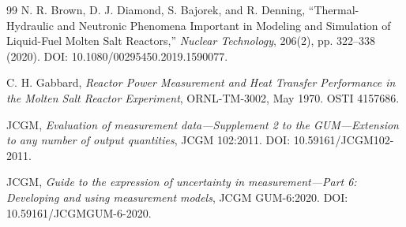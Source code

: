 \begin{thebibliography}{99}
N. R. Brown, D. J. Diamond, S. Bajorek, and R. Denning, ``Thermal-Hydraulic and Neutronic Phenomena Important in Modeling and Simulation of Liquid-Fuel Molten Salt Reactors,'' \emph{Nuclear Technology}, 206(2), pp. 322--338 (2020). DOI: 10.1080/00295450.2019.1590077.

C. H. Gabbard, \emph{Reactor Power Measurement and Heat Transfer Performance in the Molten Salt Reactor Experiment}, ORNL-TM-3002, May 1970. OSTI 4157686.

JCGM, \emph{Evaluation of measurement data---Supplement 2 to the GUM---Extension to any number of output quantities}, JCGM 102:2011. DOI: 10.59161/JCGM102-2011.

JCGM, \emph{Guide to the expression of uncertainty in measurement---Part 6: Developing and using measurement models}, JCGM GUM-6:2020. DOI: 10.59161/JCGMGUM-6-2020.

\end{thebibliography}
